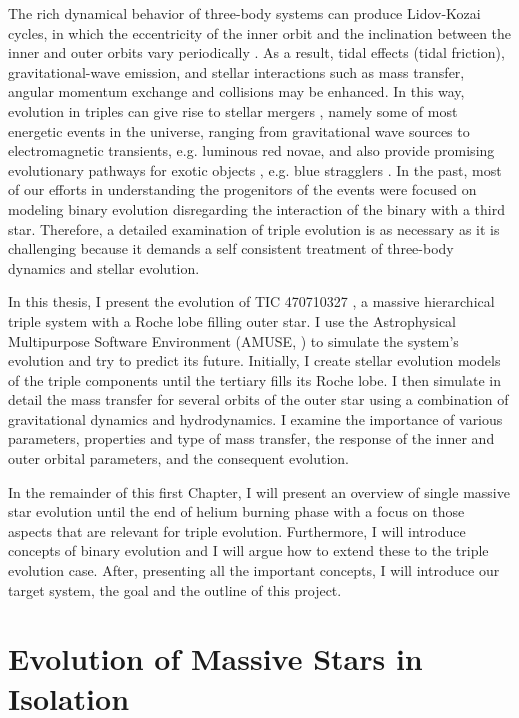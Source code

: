 The rich dynamical behavior of three-body systems can produce Lidov-Kozai cycles, in which the eccentricity of the inner orbit and the inclination between the inner and outer orbits vary periodically \citep{michaely2014secular,toonen2016evolution,mangipudi2022extreme}. As a result, tidal effects (tidal friction), gravitational-wave emission, and stellar interactions such as mass transfer, angular momentum exchange and collisions may be enhanced. In this way, evolution in triples can give rise to stellar mergers \citep{antonini2017binary,silsbee2017lidov,vigna2021massive}, namely some of most energetic events in the universe, ranging from gravitational wave sources to electromagnetic transients, e.g. luminous red novae, and also provide promising evolutionary pathways for exotic objects \citep{sana2012binary, toonen2016evolution}, e.g. blue stragglers \citep{winn2009spin}. In the past, most of our efforts in understanding the progenitors of the events were focused on modeling binary evolution disregarding the interaction of the binary with a third star. Therefore, a detailed examination of triple evolution is as necessary as it is challenging because it demands a self consistent treatment of three-body dynamics and stellar evolution.

In this thesis, I present the evolution of TIC 470710327 \citep{eisner2022planet}, a massive hierarchical triple system with a Roche lobe filling outer star. I use the Astrophysical Multipurpose Software Environment (AMUSE, \cite{portegies2018astrophysical}) to simulate the system's evolution and try to predict its future. Initially, I create stellar evolution models of the triple components until the tertiary fills its Roche lobe. I then simulate in detail the mass transfer for several orbits of the outer star using a combination of gravitational dynamics and hydrodynamics. I examine the importance of various parameters, properties and type of mass transfer, the response of the inner and outer orbital parameters, and the consequent evolution.

In the remainder of this first Chapter, I will present an overview of single massive star evolution until the end of helium burning phase with a focus on those aspects that are relevant for triple evolution. Furthermore, I will introduce concepts of binary evolution and I will argue how to extend these to the triple evolution case. After, presenting all the important concepts, I will introduce our target system, the goal and the outline of this project. 


\section{Evolution of Massive Stars in Isolation}\label{sec:single_star_evolution}

